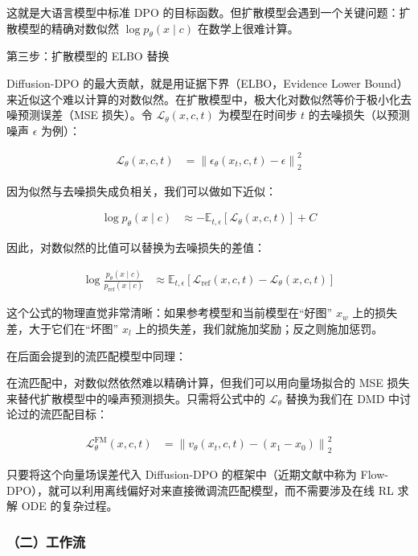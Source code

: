 这就是大语言模型中标准 DPO 的目标函数。但扩散模型会遇到一个关键问题：扩散模型的精确对数似然 \(\log p_\theta(x\mid c)\) 在数学上很难计算。

第三步：扩散模型的 ELBO 替换

Diffusion-DPO 的最大贡献，就是用证据下界（ELBO，Evidence Lower Bound）来近似这个难以计算的对数似然。在扩散模型中，极大化对数似然等价于极小化去噪预测误差（MSE 损失）。令 \(\mathcal{L}_\theta(x,c,t)\) 为模型在时间步 \(t\) 的去噪损失（以预测噪声 \(\epsilon\) 为例）：

\[
\begin{aligned}
\mathcal{L}_\theta(x,c,t)
&=\left\lVert \epsilon_\theta(x_t,c,t)-\epsilon\right\rVert_2^2
\end{aligned}
\]

因为似然与去噪损失成负相关，我们可以做如下近似：

\[
\begin{aligned}
\log p_\theta(x\mid c)
&\approx -\mathbb{E}_{t,\epsilon}\left[\mathcal{L}_\theta(x,c,t)\right]+C
\end{aligned}
\]

因此，对数似然的比值可以替换为去噪损失的差值：

\[
\begin{aligned}
\log\frac{p_\theta(x\mid c)}{p_{\mathrm{ref}}(x\mid c)}
&\approx
\mathbb{E}_{t,\epsilon}
\left[
\mathcal{L}_{\mathrm{ref}}(x,c,t)-\mathcal{L}_\theta(x,c,t)
\right]
\end{aligned}
\]

这个公式的物理直觉非常清晰：如果参考模型和当前模型在``好图'' \(x_w\) 上的损失差，大于它们在``坏图'' \(x_l\) 上的损失差，我们就施加奖励；反之则施加惩罚。

在后面会提到的流匹配模型中同理：

在流匹配中，对数似然依然难以精确计算，但我们可以用向量场拟合的 MSE 损失来替代扩散模型中的噪声预测损失。只需将公式中的 \(\mathcal{L}_\theta\) 替换为我们在 DMD 中讨论过的流匹配目标：

\[
\begin{aligned}
\mathcal{L}^{\mathrm{FM}}_\theta(x,c,t)
&=\left\lVert v_\theta(x_t,c,t)-(x_1-x_0)\right\rVert_2^2
\end{aligned}
\]

只要将这个向量场误差代入 Diffusion-DPO 的框架中（近期文献中称为 Flow-DPO），就可以利用离线偏好对来直接微调流匹配模型，而不需要涉及在线 RL 求解 ODE 的复杂过程。

\hypertarget{ux4e8cux5de5ux4f5cux6d41-2}{%
\subsubsection{（二）工作流}\label{ux4e8cux5de5ux4f5cux6d41-2}}

